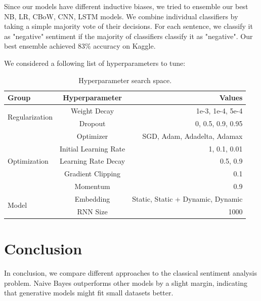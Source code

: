 \documentclass[11pt]{article}
\newcommand{\todo}[1]{{\small\color{red}{\bf [*** Todo: #1]}}}
\begin{document}
Since our models have different inductive biases, we tried to ensemble our best NB, LR, CBoW, CNN, LSTM  models. We combine individual classifiers by taking a simple majority vote of their decisions. For each sentence, we classify it as "negative" sentiment if the majority of classifiers classify it as "negative". Our best ensemble achieved 83\% accuracy on Kaggle.

We considered a following list of hyperparameters to tune:
\begin{table}[h]
\centering
\begin{tabular}{lcr}
 \toprule
  Group & Hyperparameter & Values         \\
 \midrule
  \multirow{2}{*}{Regularization} & Weight Decay & 1e-3, 1e-4, 5e-4 \\
                                  & Dropout & 0, 0.5, 0.9, 0.95 \\
  \midrule
  \multirow{5}{*}{Optimization} & Optimizer & SGD, Adam, Adadelta, Adamax   \\
           & Initial Learning Rate & 1, 0.1, 0.01 \\
           & Learning Rate Decay & 0.5, 0.9 \\
           & Gradient Clipping & 0.1 \\
           & Momentum & 0.9  \\
  \midrule
  \multirow{2}{*}{Model} & Embedding & Static, Static + Dynamic, Dynamic\\
                         & RNN Size & 1000 \\ 
 \bottomrule
\end{tabular}
\caption{\label{tab:hyper} Hyperparameter search space.}
\end{table}



\section{Conclusion}

In conclusion, we compare different approaches to the classical sentiment analysis problem. Naive Bayes outperforms other models by a slight margin, indicating that generative models might fit small datasets better.

\newpage


\end{document}
